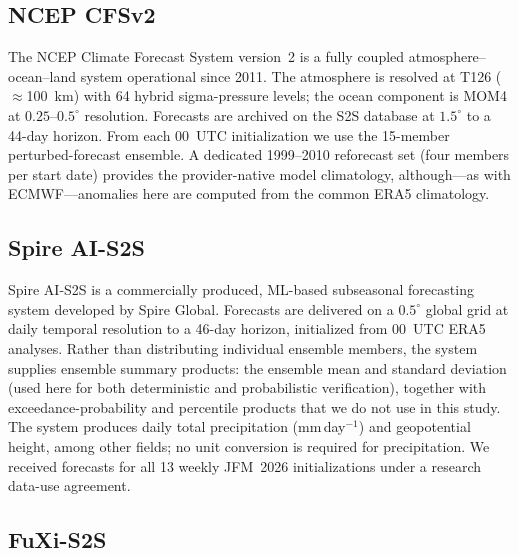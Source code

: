 \documentclass[11pt]{article}
\begin{document}
\subsection{NCEP CFSv2}\label{sec:ncep}

The NCEP Climate Forecast System version~2 \citep{saha2014} is a fully
coupled atmosphere--ocean--land system operational since 2011. The
atmosphere is resolved at T126 ($\approx$100~km) with 64 hybrid sigma-pressure
levels; the ocean component is MOM4 at $0.25$--$0.5^{\circ}$ resolution.
Forecasts are archived on the S2S database \citep{vitart2017} at
$1.5^{\circ}$ to a 44-day horizon. From each 00~UTC initialization we use
the 15-member perturbed-forecast ensemble. A dedicated
1999--2010 reforecast set (four members per start date) provides the
provider-native model climatology, although---as with ECMWF---anomalies
here are computed from the common ERA5 climatology.

\subsection{Spire AI-S2S}\label{sec:spire}

Spire AI-S2S \citep{spire2026} is a commercially produced, ML-based
subseasonal forecasting system developed by Spire Global. Forecasts are
delivered on a $0.5^{\circ}$ global grid at daily temporal resolution to a
46-day horizon, initialized from 00~UTC ERA5 analyses. Rather than
distributing individual ensemble members, the system supplies ensemble
summary products: the ensemble mean and standard deviation (used here for
both deterministic and probabilistic verification), together with
exceedance-probability and percentile products that we do not use in this
study. The system produces daily total precipitation (mm\,day$^{-1}$) and
geopotential height, among other fields; no unit conversion is required for
precipitation. We received forecasts for all 13 weekly JFM~2026
initializations under a research data-use agreement.

\subsection{FuXi-S2S}\label{sec:fuxi}
\end{document}
